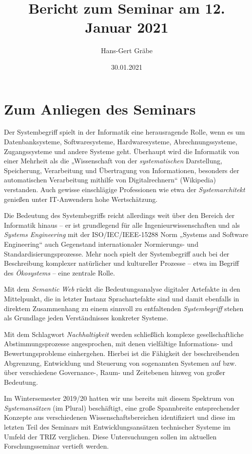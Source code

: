 \documentclass[a4paper,11pt]{article}
\author{Hans-Gert Gräbe}
\title{Bericht zum Seminar am 12. Januar 2021}
\date{30.01.2021}
\begin{document}
\maketitle

\section{Zum Anliegen des Seminars}

Der Systembegriff spielt in der Informatik eine herausragende Rolle, wenn es
um Datenbanksysteme, Softwaresysteme, Hardwaresysteme, Abrechnungssysteme,
Zugangssysteme und andere Systeme geht.  Überhaupt wird die Informatik von
einer Mehrheit als die „Wissenschaft von der \emph{systematischen}
Darstellung, Speicherung, Verarbeitung und Übertragung von Informationen,
besonders der automatischen Verarbeitung mithilfe von Digitalrechnern“
(Wikipedia) verstanden.  Auch gewisse einschlägige Professionen wie etwa der
\emph{Systemarchitekt} genießen unter IT-Anwendern hohe Wertschätzung.

Die Bedeutung des Systembegriffs reicht allerdings weit über den Bereich der
Informatik hinaus -- er ist grundlegend für alle Ingenieurwissenschaften und
als \emph{Systems Engineering} mit der ISO/IEC/IEEE-15288 Norm „Systems and
Software Engineering“ auch Gegenstand internationaler Normierungs- und
Standardisierungsprozesse.  Mehr noch spielt der Systembegriff auch bei der
Beschreibung komplexer natürlicher und kultureller Prozesse -- etwa im Begriff
des \emph{Ökosystems} -- eine zentrale Rolle.

Mit dem \emph{Semantic Web} rückt die Bedeutungsanalyse digitaler Artefakte in
den Mittelpunkt, die in letzter Instanz Sprachartefakte sind und damit
ebenfalls in direktem Zusammenhang zu einem sinnvoll zu entfaltenden
\emph{Systembegriff} stehen als Grundlage jeden Verständnisses konkreter
Systeme.

Mit dem Schlagwort \emph{Nachhaltigkeit} werden schließlich komplexe
gesellschaftliche Abstimmungsprozesse angesprochen, mit denen vielfältige
Informations- und Bewertungsprobleme einhergehen. Hierbei ist die Fähigkeit
der beschreibenden Abgrenzung, Entwicklung und Steuerung von sogenannten
Systemen auf bzw. über verschiedene Governance-, Raum- und Zeitebenen hinweg
von großer Bedeutung.

Im Wintersemester 2019/20 hatten wir uns bereits mit diesem Spektrum von
\emph{Systemansätzen} (im Plural) beschäftigt, eine große Spannbreite
entsprechender Konzepte aus verschiedenen Wissenschaftsbereichen identifiziert
und diese im letzten Teil des Seminars mit Entwicklungsansätzen technischer
Systeme im Umfeld der TRIZ verglichen.  Diese Untersuchungen sollen im
aktuellen Forschungsseminar vertieft werden.
\end{document}
